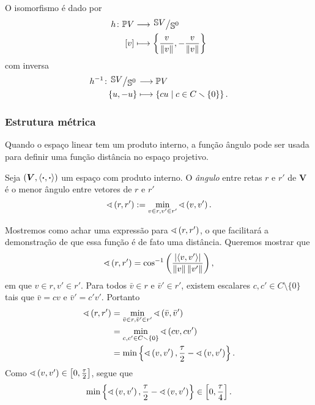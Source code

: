 O isomorfismo é dado por
	\begin{align*}
	\func{h}{\pro V}{\quo{\S V}{\S^0}}{[v]}{\left\{\frac{v}{\nor{v}},-\frac{v}{\nor{v}}\right\}}
	\end{align*}
com inversa
	\begin{align*}
	\func{h\inv}{\quo{\S V}{\S^0}}{\pro V}{\{u,-u\}}{\set{cu}{c \in C \setminus \{0\}}}.
	\end{align*}

\subsubsection{Estrutura métrica}

Quando o espaço linear tem um produto interno, a função ângulo pode ser usada para definir uma função distância no espaço projetivo.

\begin{definition}
Seja $(\bm V,\left\langle{\bm{\cdot}},{\bm{\cdot}}\right\rangle)$ um espaço com produto interno. O \emph{ângulo} entre retas $r$ e $r'$ de $\bm V$ é o menor ângulo entre vetores de $r$ e $r'$
	\begin{equation*}
	\sphericalangle\left({r},{r'}\right) := \min_{v \in r, v' \in r'} \sphericalangle\left({v},{v'}\right).
	\end{equation*}
\end{definition}

Mostremos como achar uma expressão para $\sphericalangle\left({r},{r'}\right)$, o que facilitará a demonstração de que essa função é de fato uma distância. Queremos mostrar que
	\begin{equation*}
	\sphericalangle\left({r},{r'}\right) = \cos^{-1} \left( \frac{\left\vert{\left\langle{v},{v'}\right\rangle}\right\vert}{\left\Vert{v}\right\Vert\left\Vert{v'}\right\Vert} \right),
	\end{equation*}
em que $v \in r, v' \in r'$. Para todos $\bar v \in r$ e $\bar v' \in r'$, existem escalares $c,c' \in C \setminus \{0\}$ tais que $\bar v = cv$ e $\bar v' = c'v'$. Portanto
	\begin{align*}
	\sphericalangle\left({r},{r'}\right) &= \min_{\bar v \in r, \bar v' \in r'} \sphericalangle\left({\bar v},{\bar v'}\right) \\
		&= \min_{c,c' \in C \smallsetminus \{0\}} \sphericalangle\left({cv},{cv'}\right) \\
		&= \min \left\{ \sphericalangle\left({v},{v'}\right), \frac{\tau}{2} - \sphericalangle\left({v},{v'}\right) \right\}.
	\end{align*}
Como $\sphericalangle\left({v},{v'}\right) \in \left[0,\allowbreak \frac{\tau}{2}\right]$, segue que
	\begin{equation*}
	\min \left\{ \sphericalangle\left({v},{v'}\right), \frac{\tau}{2} - \sphericalangle\left({v},{v'}\right) \right\} \in \left[0,\allowbreak \frac{\tau}{4}\right].
	\end{equation*}

